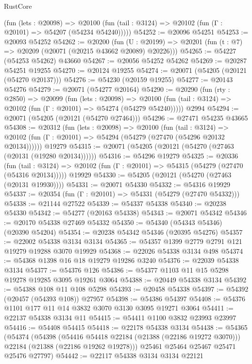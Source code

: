 \begin{lexlean}{RustCore}
\begin{coremodule}
      (fun (lets : @20098) =>
      @20100 (fun (tail : @3124) => @20102 (fun (Γ : @20101) => @54207 (@54234 @54240)))))
@54252 := @20096 @54251
@54253 := @20093 @54252
@54262 := @20200
    (fun (U : @20199) => @20201 (fun (t : @7) => @20209 (@20071 (@20215 @43662 @20089) @20226)))
@54265 := @54227 (@54253 @54262) @43660
@54267 := @20056 @54252 @54262
@54269 := @20287 @54251 @19255
@54270 := @20124 @19255
@54274 := @20071 (@54205 (@20121 (@54270 @20137)))
@54276 := @54230 (@20159 @19255)
@54277 := @20143 @54276
@54279 := @20071 (@54277 @20164)
@54290 := @20290
    (fun (rty : @2850) =>
    @20099
      (fun (lets : @20098) =>
      @20100 (fun (tail : @3124) => @20102 (fun (Γ : @20101) => @54274 (@54279 @54240)))))
    @2994
@54294 := @20071 (@54205 (@20121 (@54270 @27464)))
@54296 := @27471 @54235 @43665
@54308 := @20312
    (fun (lets : @20098) =>
    @20100
      (fun (tail : @3124) =>
      @20102 (fun (Γ : @20101) => @54294 (@54279 (@27470 (@54296 @20132 @20134))))))
    @19279
@54315 := @20071 (@54205 (@20121 (@54270 (@27463 (@20131 (@19280 @20134))))))
@54316 := @54296 @19279
@54325 := @20336
    (fun (tail : @3124) => @20102 (fun (Γ : @20101) => @54315 (@54279 (@27470 (@54316 @20134)))))
    @19929
@54330 := @54205 (@20121 (@54270 (@27463 (@20131 @19930))))
@54331 := @20071 @54330
@54332 := @54316 @19929
@54337 := @20354 (fun (Γ : @20101) => @54331 (@54279 (@27470 @54332)))
@54338 := @21144 @27522
@54339 := @54337 @54338
@54340 := @20238 @54330
@54342 := @54277 (@20163 @54338)
@54343 := @20071 @54342
@54346 := @20170 @54338 @27469 @54332
@54350 := @54340 (@54343 @54346) (@20390 @54204)
@54354 := @20238 @54342 @54346 (@20395 @54276)
@54357 := @22002 @54338 @3134 @3134
@54365 := @54357 @1399 @2779 @2791 @121 @19279 @19288 @3070 @19929
@54368 := @22026 @54338 @3134 @498
@54374 := @54368 @1398 @16 @18 @19279 @19286 @3240
@54376 := @22039 @54338 @3134
@54377 := @54376 @126
@54386 := @54377 @1103 @11 @15 @5298 @19278 @19285 @3095 @19261 @3064
@54388 := @20449 @54338 @3134
@54392 := @54388 @108 @11 @108 @5298
@54393 := @20458 @54338
@54397 := @54392 (@20457 (@54393 @108)) @27957
@54398 := @54386 @54397
@54408 := @54376 @1101 @177 @11 @14 @3832 @3070 @3130 @3095 @19271 @3064
@54411 := @22137 @54338 @3134 @11
@54415 := @54411 @1100 @3832 @23993 @23997
@54416 := @54408 @54415
@54418 := @22178 @54338 @3134
@54438 := @54365
    (@54374
      (@54398
        (@54416 @54418 @22184 (@21388 (@22186 @19272 @3070)))
        @22184
        (@21388 (@22186 @19262 @19278)))
      @25461
      @25464
      @25467
      @25471
      @25476
      @27797)
@54442 := @22117 @54338 @3134 @3134 @22121

\end{coremodule}
\end{lexlean}
